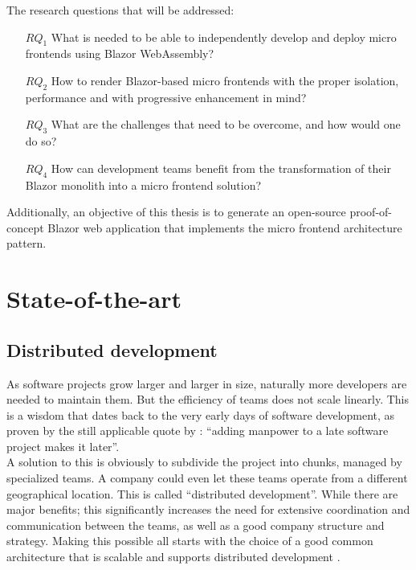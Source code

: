 \begin{minipage}{\linewidth} %
     The research questions that will be addressed:
    \begin{itemize}
        \item[$RQ_1$] What is needed to be able to independently develop and
        deploy micro frontends using Blazor WebAssembly?
        \item[$RQ_2$] How to render Blazor-based micro frontends with the proper
        isolation, performance and with progressive enhancement in mind?
        \item[$RQ_3$] What are the challenges that need to be overcome, and how
        would one do so? 
        \item[$RQ_4$] How can development teams benefit from the transformation
        of their Blazor monolith into a micro frontend solution?
    \end{itemize}
\end{minipage}

\blankline
Additionally, an objective of this thesis is to generate an open-source
proof-of-concept Blazor web application that implements the micro frontend
architecture pattern.




\section{State-of-the-art}
\label{sec:state-of-the-art}

\subsection{Distributed development}
As software projects grow larger and larger in size, naturally more developers
are needed to maintain them. But the efficiency of teams does not scale
linearly. This is a wisdom that dates back to the very early days of software
development, as proven by the still applicable quote by \textcite{Brooks_1975}:
``adding manpower to a late software project makes it later''.\\
A solution to this is obviously to subdivide the project into chunks, managed by
specialized teams. A company could even let these teams operate from a different
geographical location. This is called ``distributed development''. While there
are major benefits; this significantly increases the need for extensive
coordination and communication between the teams, as well as a good company
structure and strategy. Making this possible all starts with the choice of a
good common architecture that is scalable and supports distributed development
\autocite{Yuhong_2008}. 

